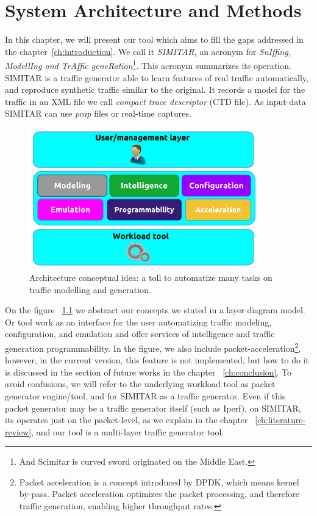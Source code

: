 \chapter{System Architecture and Methods}\label{ch:architecture}


In this chapter, we will present our tool which aims to fill the gaps addressed in the chapter~\ref{ch:introduction}. We call it \textit{SIMITAR}, an acronym for \textit{SnIffing, ModellIng and TrAffic geneRation}\footnote{And Scimitar is curved sword originated on the Middle East.}.  This acronym summarizes its operation. SIMITAR is a traffic generator able to learn features of real traffic automatically, and reproduce synthetic traffic similar to the original. It records a model for the traffic in an XML file we call \textit{compact trace descriptor} (CTD file). As input-data SIMITAR can use \textit{pcap} files or real-time captures.  


\begin{figure}[ht!]
    \centering
    \includegraphics[height=2.4in]{figures/ch1/layer-diagram}
    \caption{ Architecture conceptual idea: a toll to automatize many tasks on traffic modelling and generation.}
    \label{fig:layer-diagram}
\end{figure}

On the figure ~\ref{fig:layer-diagram} we abstract our concepts we stated in a layer diagram model. Or tool work as an interface for the user automatizing traffic modeling, configuration, and emulation and offer services of intelligence and traffic generation programmability. In the figure, we also include packet-acceleration\footnote{Packet acceleration is a concept introduced by DPDK\cite{web-dpdk}, which means kernel by-pass. Packet acceleration optimizes the packet processing, and therefore traffic generation, enabling higher throughput rates.}, however, in the current version, this feature is not implemented, but how to do it is discussed in the section of future works in the chapter ~\ref{ch:conclusion}. To avoid confusions, we will refer to the underlying workload tool as packet generator engine/tool, and for SIMITAR as a traffic generator. Even if this packet generator may be a traffic generator itself (such as Iperf), on SIMITAR, its operates just on the packet-level, as we explain in the chapter ~\ref{ch:literature-review}, and our tool is a multi-layer traffic generator tool.


